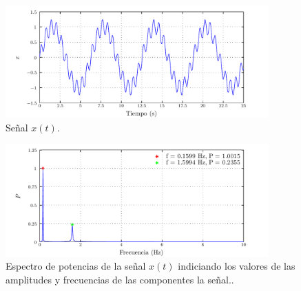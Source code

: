 \documentclass[a4paper,12pt,final]{article}
\begin{document}
    \newpage
    \vspace{-1em}
    \begin{listing}[H]
      \label{scr:1.1c}
      \inputminted[firstline=82]{matlab}{./laboratorio_5/problema01.m}
    \end{listing}

    \begin{figure}[H]
      \begin{center}
        \caption{Señal $x\left(t\right)$.}
        \label{p1f1}
        \vspace{-1em}
        \includegraphics[width=0.9\textwidth]{./laboratorio_5/problema01_signal.pdf}
      \end{center}
    \end{figure}

    \begin{figure}[H]
      \begin{center}
        \caption{Espectro de potencias de la señal $x\left(t\right)$ indiciando los valores de las amplitudes y frecuencias de las componentes la señal..}
        \label{p1f2}
        \vspace{-1em}
        \includegraphics[width=0.9\textwidth]{./laboratorio_5/problema01_power_spectrum.pdf}
      \end{center}
    \end{figure}
\end{document}
